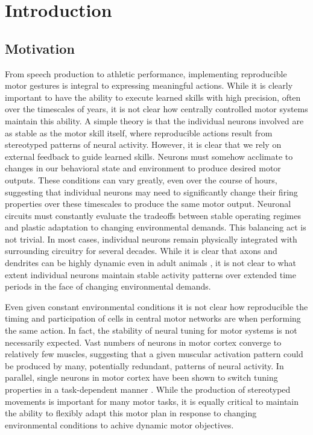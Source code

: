 \chapter{Introduction}
\label{chapter:Introduction}
\thispagestyle{myheadings}

\graphicspath{{1_Intro/Figures/}}

\section{Motivation}
\label{sec:history}

From speech production to athletic performance, implementing reproducible motor gestures is integral to expressing meaningful actions. While it is clearly important to have the ability to execute  learned skills with high precision, often over the timescales of years, it is not clear how centrally controlled motor systems maintain this ability. A simple theory is that the individual neurons involved are as stable as the motor skill itself, where reproducible actions result from stereotyped patterns of neural activity. However, it is clear that we rely on external feedback to guide learned skills. Neurons must somehow acclimate to changes in our behavioral state and environment to produce desired motor outputs. These conditions can vary greatly, even over the course of hours, suggesting that individual neurons may need to significantly change their firing properties over these timescales to produce the same motor output. Neuronal circuits must constantly evaluate the tradeoffs between stable operating regimes and plastic adaptation to changing environmental demands. This balancing act is not trivial. In most cases, individual neurons remain physically integrated with surrounding circuitry for several decades. While it is clear that axons and dendrites can be highly dynamic even in adult animals \cite{Holtmaat2009-ie}, it is not clear to what extent individual neurons maintain stable activity patterns over extended time periods in the face of changing environmental demands.
 
Even given constant environmental conditions it is not clear how reproducible the timing and participation of cells in central motor networks are when performing the same action. In fact, the stability of neural tuning for motor systems is not necessarily expected.  Vast numbers of neurons in motor cortex converge to relatively few muscles, suggesting that a given muscular activation pattern could be produced by many, potentially redundant, patterns of neural activity. In parallel, single neurons in motor cortex have been shown to switch tuning properties in a task-dependent manner \cite{Koralek2012-nd}. While the production of stereotyped movements is important for many motor tasks, it is equally critical to maintain the ability to flexibly adapt this motor plan in response to changing environmental conditions to achive dynamic motor objectives. 
 
